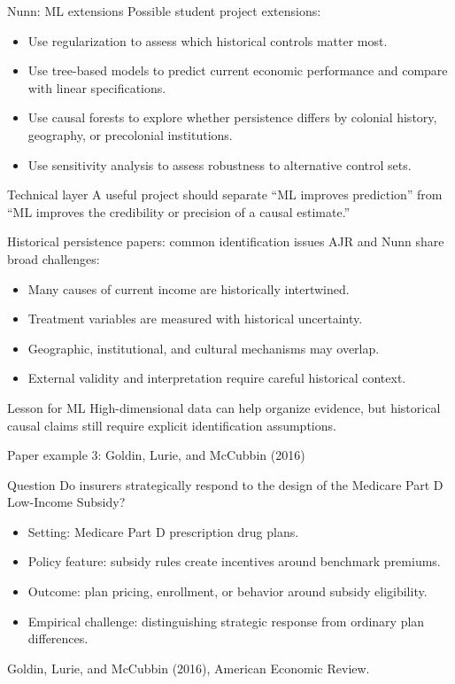 \documentclass[aspectratio=169,11pt]{beamer}
\newcommand{\grad}[1]{\begin{alertblock}{Technical layer}#1\end{alertblock}}
\newcommand{\smallcite}[1]{{\scriptsize \textcolor{WLUGray}{#1}}}
\begin{document}
\begin{frame}{Nunn: ML extensions}
Possible student project extensions:
\begin{itemize}
  \item Use regularization to assess which historical controls matter most.
  \item Use tree-based models to predict current economic performance and compare with linear specifications.
  \item Use causal forests to explore whether persistence differs by colonial history, geography, or precolonial institutions.
  \item Use sensitivity analysis to assess robustness to alternative control sets.
\end{itemize}
\grad{
A useful project should separate ``ML improves prediction'' from ``ML improves the credibility or precision of a causal estimate.''
}
\end{frame}

\begin{frame}{Historical persistence papers: common identification issues}
AJR and Nunn share broad challenges:
\begin{itemize}
  \item Many causes of current income are historically intertwined.
  \item Treatment variables are measured with historical uncertainty.
  \item Geographic, institutional, and cultural mechanisms may overlap.
  \item External validity and interpretation require careful historical context.
\end{itemize}
\begin{alertblock}{Lesson for ML}
High-dimensional data can help organize evidence, but historical causal claims still require explicit identification assumptions.
\end{alertblock}
\end{frame}

\begin{frame}{Paper example 3: Goldin, Lurie, and McCubbin (2016)}
\begin{block}{Question}
Do insurers strategically respond to the design of the Medicare Part D Low-Income Subsidy?
\end{block}
\begin{itemize}
  \item Setting: Medicare Part D prescription drug plans.
  \item Policy feature: subsidy rules create incentives around benchmark premiums.
  \item Outcome: plan pricing, enrollment, or behavior around subsidy eligibility.
  \item Empirical challenge: distinguishing strategic response from ordinary plan differences.
\end{itemize}
\smallcite{Goldin, Lurie, and McCubbin (2016), American Economic Review.}
\end{frame}
\end{document}
